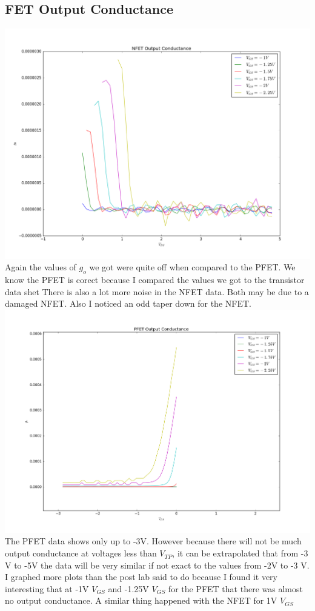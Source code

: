 \documentclass[12pt, oneside]{article}
\begin{document}
\subsection{FET Output Conductance}
	\begin{center}
		\includegraphics[scale=.4]{nfet_d}\\
		Again the values of $g_o$ we got were quite off when compared to the PFET. We know the PFET is corect because I compared the values we got to the transistor data shet There is also a lot more noise in the NFET data. Both may be due to a damaged NFET. Also I noticed an odd taper down for the NFET.
		\includegraphics[scale=.4]{pfet_d}\\
		The PFET data shows only up to -3V. However because there will not be much output conductance at voltages less than $V_{TP}$, it can be extrapolated that from -3 V to -5V the data will be very similar if not exact to the values from -2V to -3 V.\\
		I graphed more plots than the post lab said to do because I found it very interesting that at -1V $V_{GS}$ and -1.25V  $V_{GS}$ for the PFET that there was almost no output conductance. A similar thing happened with the NFET for 1V  $V_{GS}$
	\end{center}
\end{document}
